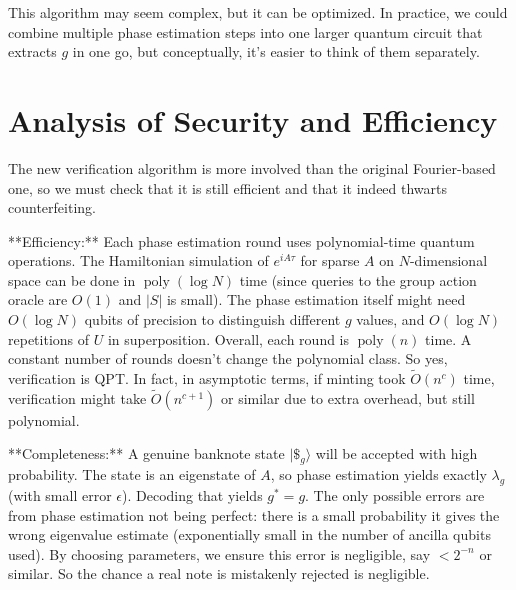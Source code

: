 \documentclass[11pt]{article}
\theoremstyle{definition}
\begin{document}
    This algorithm may seem complex, but it can be optimized. In practice, we could combine multiple phase estimation steps into one larger quantum circuit that extracts $g$ in one go, but conceptually, it’s easier to think of them separately.

    \section{Analysis of Security and Efficiency}
    The new verification algorithm is more involved than the original Fourier-based one, so we must check that it is still efficient and that it indeed thwarts counterfeiting.

    **Efficiency:** Each phase estimation round uses polynomial-time quantum operations. The Hamiltonian simulation of $e^{iA\tau}$ for sparse $A$ on $N$-dimensional space can be done in $\operatorname{poly}(\log N)$ time (since queries to the group action oracle are $O(1)$ and $|S|$ is small). The phase estimation itself might need $O(\log N)$ qubits of precision to distinguish different $g$ values, and $O(\log N)$ repetitions of $U$ in superposition. Overall, each round is $\operatorname{poly}(n)$ time. A constant number of rounds doesn’t change the polynomial class. So yes, verification is QPT. In fact, in asymptotic terms, if minting took $\tilde{O}(n^c)$ time, verification might take $\tilde{O}(n^{c+1})$ or similar due to extra overhead, but still polynomial.

    **Completeness:** A genuine banknote state $|\$_g\rangle$ will be accepted with high probability. The state is an eigenstate of $A$, so phase estimation yields exactly $\lambda_g$ (with small error $\epsilon$). Decoding that yields $g^* = g$. The only possible errors are from phase estimation not being perfect: there is a small probability it gives the wrong eigenvalue estimate (exponentially small in the number of ancilla qubits used). By choosing parameters, we ensure this error is negligible, say $< 2^{-n}$ or similar. So the chance a real note is mistakenly rejected is negligible.
\end{document}
